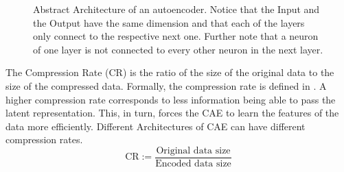 \begin{figure}[ht]
\caption{Abstract Architecture of an autoencoder. Notice that the Input and the Output have the same dimension and that each of the layers only connect to the respective next one. Further note that a neuron of one layer is not connected to every other neuron in the next layer.}
\label{fig:autoencoderArchitecture}
\end{figure}
The Compression Rate (CR) is the ratio of the size of the original data to the size of the compressed data. 
Formally, the compression rate is defined in . 
A higher compression rate corresponds to less information being able to pass the latent representation. 
This, in turn, forces the CAE to learn the features of the data more efficiently.
Different Architectures of CAE can have different compression rates.
\begin{equation}
	\text{CR} := \frac{\text{Original data size}}{\text{Encoded data size}}
	\label{eq:cr}
\end{equation}